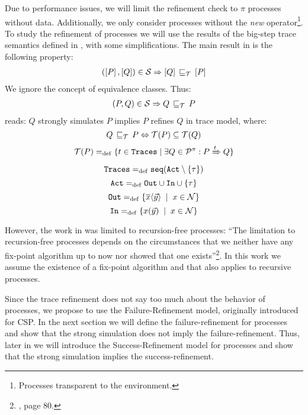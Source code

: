 Due to performance issues, we will limit the refinement check to $\pi$ processes without data. Additionally, we only consider processes without the \textit{new} operator\footnote{Processes transparent to the environment.}. To study the refinement of \picalc{} processes we will use the results of the big-step trace semantics defined in \cite{gieseking}, with some simplifications. 
The main result in \cite{gieseking} is the following property:
\begin{align}
    (\ec{P},\ec{Q})\in{}\simu \Rightarrow \ec{Q} \refi \ec{P} \label{property1}
\end{align}
We ignore the concept of equivalence classes. Thus:
\begin{align}
    (P,Q)\in{}\simu \Rightarrow Q \refi P
\label{property2}
\end{align}
 reads: $Q$ strongly simulates $P$ implies $P$ refines $Q$ in trace model, where:
\[Q\refi P \Leftrightarrow \Traces[P]\subseteq\Traces[Q]\]
\[\Traces[P] \define \{t\in \tr \mid \exists Q\in\procs: P \bigstep{t} Q\}\]
\[\tr \define \seqset{\actions\setminus\set{\tau}}\]
\[\actions\define\outA\cup\inA\cup\set{\tau}\]
\[\outA\define\set[x\in\names]{\out{x}{\vec{y}}}\]
\[\inA\define\set[x\in\names]{\inp{x}{\vec{y}}}\]

However, the work in \cite{gieseking} was limited to recursion-free processes: ``The limitation to recursion-free processes depends on the circumstances that we neither have any fix-point algorithm up to now nor showed that one exists''\footnote{\cite{gieseking}, page $80$.}. In this work we assume the existence of a fix-point algorithm and that  also applies to recursive processes.


Since the trace refinement does not say too much about the behavior of processes, we propose to use the Failure-Refinement model, originally introduced for CSP. In the next section we will define the failure-refinement for \picalc{} processes and show that the strong simulation does not imply the failure-refinement. Thus, later in  we will introduce the Success-Refinement model for \picalc{} processes and show that the strong simulation implies the success-refinement.